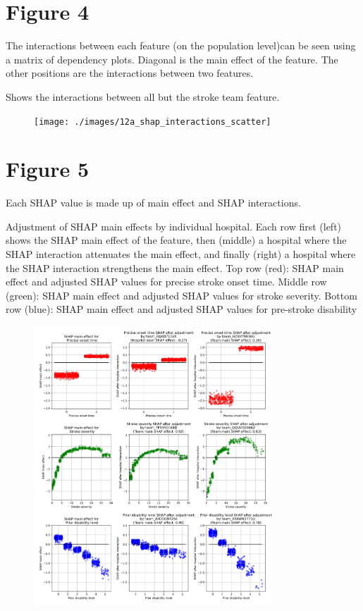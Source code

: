 \newpage
\section{Figure 4}

The interactions between each feature (on the population level)can be seen using a matrix of dependency plots. Diagonal is the main effect of the feature. The other positions are the interactions between two features.

Shows the interactions between all but the stroke team feature.
\begin{figure}[!h]
\centering
\texttt{[image: ./images/12a\_shap\_interactions\_scatter]}
\caption{}
\label{fig:results_9}
\end{figure}

\newpage

\section{Figure 5}

Each SHAP value is made up of main effect and SHAP interactions.

Adjustment of SHAP main effects by individual hospital. Each row first (left) shows the SHAP main effect of the feature, then (middle) a hospital where the SHAP interaction attenuates the main effect, and finally (right) a hospital where the SHAP interaction strengthens the main effect. Top row (red): SHAP main effect and adjusted SHAP values for precise stroke onset time. Middle row (green): SHAP main effect and adjusted SHAP values for stroke severity. Bottom row (blue): SHAP main effect and adjusted SHAP values for pre-stroke disability

\begin{figure}[!h]
\centering
\includegraphics[width=0.8\textwidth]{./images/12aa_three_way_shap_adjustment}
\caption{}
\label{fig:results_2}
\end{figure}

